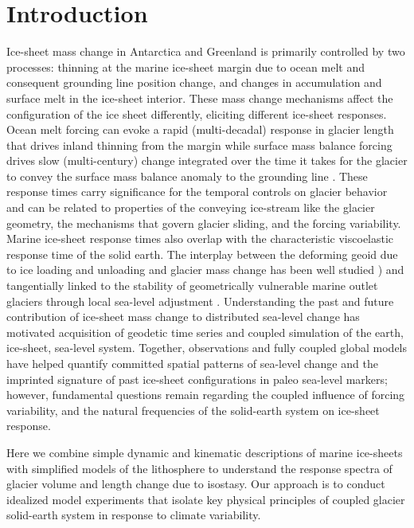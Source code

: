 \documentclass[tc, manuscript]{copernicus}
\begin{document}
\section{Introduction} 
Ice-sheet mass change in Antarctica and Greenland is primarily controlled by two processes: thinning at the marine ice-sheet margin due to ocean melt and consequent grounding line position change, and changes in accumulation and surface melt in the ice-sheet interior. 
These mass change mechanisms affect the configuration of the ice sheet differently, eliciting different ice-sheet responses. 
Ocean melt forcing can evoke a rapid (multi-decadal) response in glacier length that drives inland thinning from the margin while surface mass balance forcing drives slow (multi-century) change integrated over the time it takes for the glacier to convey the surface mass balance anomaly to the grounding line \citep{robel2018,christian2020}.
These response times carry significance for the temporal controls on glacier behavior and can be related to properties of the conveying ice-stream like the glacier geometry, the mechanisms that govern glacier sliding, and the forcing variability.
Marine ice-sheet response times also overlap with the characteristic viscoelastic response time of the solid earth.
The interplay between the deforming geoid due to ice loading and unloading and glacier mass change has been well studied \citep{weertman1972,weertman1980b,pollard1984}) and tangentially linked to the stability of geometrically vulnerable marine outlet glaciers through local sea-level adjustment \citet{gomez2010}. 
Understanding the past and future contribution of ice-sheet mass change to distributed sea-level change has motivated acquisition of geodetic time series and coupled simulation of the earth, ice-sheet, sea-level system. 
Together, observations and fully coupled global models have helped quantify committed spatial patterns of sea-level change and the imprinted signature of past ice-sheet configurations in paleo sea-level markers; however, fundamental questions remain regarding the coupled influence of forcing variability, and the natural frequencies of the solid-earth system on ice-sheet response.

Here we combine simple dynamic and kinematic descriptions of marine ice-sheets with simplified models of the lithosphere to understand the response spectra of glacier volume and length change due to isostasy. 
Our approach is to conduct idealized model experiments that isolate key physical principles of coupled glacier solid-earth system in response to climate variability. 
\end{document}
